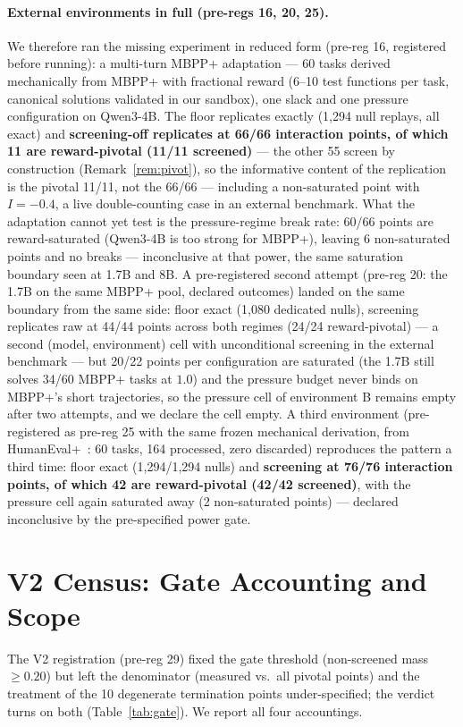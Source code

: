 \documentclass{article}
\theoremstyle{remark}
\begin{document}
\paragraph{External environments in full (pre-regs 16, 20, 25).}
We therefore
ran the missing experiment in reduced form (pre-reg 16, registered before
running): a multi-turn MBPP+ adaptation --- 60 tasks derived mechanically
from MBPP+ \citep{evalplus2023} with fractional reward (6--10 test functions
per task, canonical solutions validated in our sandbox), one slack and one
pressure configuration on Qwen3-4B. The floor replicates exactly (1{,}294
null replays, all exact) and \textbf{screening-off replicates at 66/66
interaction points, of which 11 are reward-pivotal (11/11 screened)} ---
the other 55 screen by construction (Remark~\ref{rem:pivot}), so the
informative content of the replication is the pivotal 11/11, not the 66/66
--- including a non-saturated point with $I=-0.4$, a
live double-counting case in an external benchmark. What the adaptation
cannot yet test is the pressure-regime break rate: 60/66 points are
reward-saturated (Qwen3-4B is too strong for MBPP+), leaving 6 non-saturated
points and no breaks --- inconclusive at that power, the same saturation
boundary seen at 1.7B and 8B. A pre-registered second attempt (pre-reg 20: the
1.7B on the same MBPP+ pool, declared outcomes) landed on the same
boundary from the same side: floor exact (1{,}080 dedicated nulls), screening
replicates raw at 44/44 points across both regimes (24/24 reward-pivotal)
--- a second (model,
environment) cell with unconditional screening in the external benchmark --- but 20/22 points per
configuration are saturated (the 1.7B still solves 34/60 MBPP+ tasks at
$1.0$) and the pressure budget never binds on MBPP+'s short trajectories,
so the pressure cell of environment B remains empty after two attempts,
and we declare the cell empty. A third environment
(pre-registered as pre-reg 25 with the same frozen mechanical derivation, from
HumanEval+~\citep{evalplus2023}: 60 tasks, 164 processed, zero discarded)
reproduces the pattern a third time: floor exact (1{,}294/1{,}294 nulls)
and \textbf{screening at 76/76 interaction points, of which 42 are
reward-pivotal (42/42 screened)}, with the pressure cell again saturated
away (2 non-saturated points) --- declared inconclusive by the
pre-specified power gate.

\section{V2 Census: Gate Accounting and Scope}
\label{app:v2scope}
The V2 registration (pre-reg 29) fixed the gate threshold (non-screened
mass $\geq 0.20$) but left the denominator (measured vs.\ all pivotal
points) and the treatment of the 10 degenerate termination points
under-specified; the verdict turns on both (Table~\ref{tab:gate}). We
report all four accountings.
\end{document}
